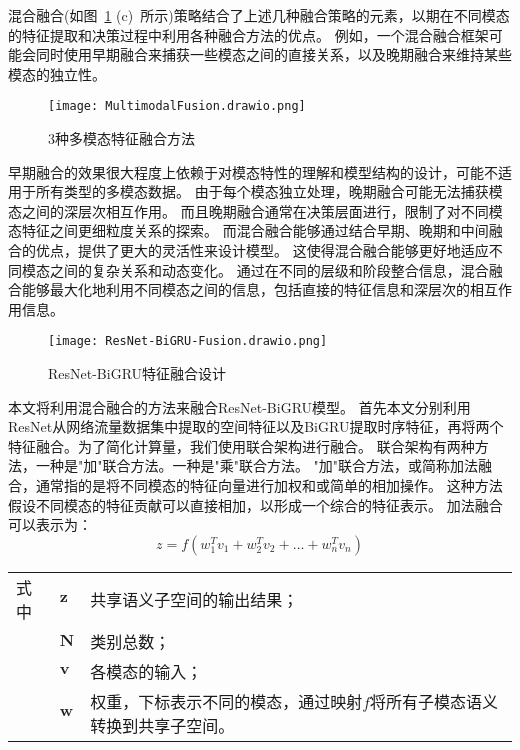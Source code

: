混合融合(如图~\ref{fig:MultimodalFusio} (c)~所示)策略结合了上述几种融合策略的元素，以期在不同模态的特征提取和决策过程中利用各种融合方法的优点。
例如，一个混合融合框架可能会同时使用早期融合来捕获一些模态之间的直接关系，以及晚期融合来维持某些模态的独立性。

\begin{figure}[htbp]
  \centering
  \texttt{[image: MultimodalFusion.drawio.png]}
  \caption{3种多模态特征融合方法\cite{hejunandzhangcaiqing}}
  \label{fig:MultimodalFusio}
\end{figure}

早期融合的效果很大程度上依赖于对模态特性的理解和模型结构的设计，可能不适用于所有类型的多模态数据。
由于每个模态独立处理，晚期融合可能无法捕获模态之间的深层次相互作用。
而且晚期融合通常在决策层面进行，限制了对不同模态特征之间更细粒度关系的探索。
而混合融合能够通过结合早期、晚期和中间融合的优点，提供了更大的灵活性来设计模型。
这使得混合融合能够更好地适应不同模态之间的复杂关系和动态变化。
通过在不同的层级和阶段整合信息，混合融合能够最大化地利用不同模态之间的信息，包括直接的特征信息和深层次的相互作用信息。\par

\begin{figure}[htbp]
  \centering
  \texttt{[image: ResNet-BiGRU-Fusion.drawio.png]}
  \caption{ResNet-BiGRU特征融合设计}
  \label{fig:ResNet-BiGRU-Fusion}
\end{figure}

本文将利用混合融合的方法来融合ResNet-BiGRU模型。
首先本文分别利用ResNet从网络流量数据集中提取的空间特征以及BiGRU提取时序特征，再将两个特征融合。为了简化计算量，我们使用联合架构进行融合。
联合架构有两种方法，一种是"加"联合方法。一种是"乘"联合方法。
"加"联合方法，或简称加法融合，通常指的是将不同模态的特征向量进行加权和或简单的相加操作。
这种方法假设不同模态的特征贡献可以直接相加，以形成一个综合的特征表示。
加法融合可以表示为：
\begin{equation}
  z = f(w_1^Tv_1 + w_2^Tv_2+ \dots + w_n^Tv_n)
\end{equation}
\begin{flushleft}
  \renewcommand\arraystretch{1.25}
  \begin{tabularx}{\textwidth}{@{}>{\normalsize\rm}l@{\quad}>{\normalsize\rm}l@{——}>{\normalsize\rm}X@{}}
  式中& $\symbf{z}$ &共享语义子空间的输出结果；\\
  &  $\symbf{N}$&类别总数；\\
  &  $\symbf{v}$ &各模态的输入；\\
  &  $\symbf{w}$ & 权重，下标表示不同的模态，通过映射$f$将所有子模态语义转换到共享子空间。\\
  \end{tabularx}\vspace{.5ex}%
  \end{flushleft}


